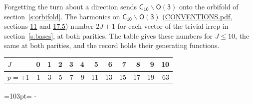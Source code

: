 \documentclass[10pt,a4paper]{article}
\newcommand{\needspace}[1]{\par\penalty-100\begingroup\dimen0=#1\relax\dimen2=\pagegoal
  \advance\dimen2-\pagetotal\ifdim\dimen0>\dimen2\relax\ifdim\dimen2>0pt\vfil\break\fi\fi
  \endgroup}
\numberwithin{equation}{section}
\newcommand{\grp}[1]{\mathsf{#1}}
\begin{document}
Forgetting the turn about a direction sends $\grp{C_{10}}\backslash\grp{O(3)}$ onto the orbifold of section~\ref{s:orbifold}.
The harmonics on $\grp{C_{10}}\backslash\grp{O(3)}$ (\href{../../CONVENTIONS.pdf}{CONVENTIONS.pdf}, sections \href{../../CONVENTIONS.pdf\#conv.11}{11} and \href{../../CONVENTIONS.pdf\#conv.17.5}{17.5}) number $2J + 1$ for each vector of the trivial irrep in section~\ref{s:bases}, at both parities. The table gives these numbers for $J \le 10$, the same at both parities, and the record holds their generating functions.
{\small\setlength{\tabcolsep}{4pt}\begin{longtable}{@{}lrrrrrrrrrrr@{}}\toprule
$J$ & 0 & 1 & 2 & 3 & 4 & 5 & 6 & 7 & 8 & 9 & 10\\\midrule\endhead
\bottomrule\endfoot\endlastfoot
$p = \pm 1$ & 1 & 3 & 5 & 7 & 9 & 11 & 13 & 15 & 17 & 19 & 63\\
\bottomrule\end{longtable}}
\needspace{103pt}
\end{document}
